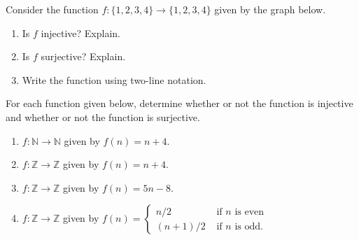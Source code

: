 \documentclass[10pt,]{book}
\theoremstyle{plain}
\theoremstyle{definition}
\theoremstyle{definition}
\theoremstyle{definition}
\theoremstyle{definition}
\numberwithin{equation}{chapter}
\def\N{\mathbb N}
\def\Z{\mathbb Z}
\newcommand{\amp}{&}
\begin{document}
\begin{divisionexercise}{4}\hypertarget{exercise-206}{}
\hypertarget{p-1691}{}%
Consider the function \(f:\{1,2,3,4\} \to \{1,2,3,4\}\) given by the graph below.%
\begin{sidebyside}{1}{0.3}{0.3}{0}
\begin{sbspanel}{0.4}
\end{sbspanel}
\end{sidebyside}
\par
\hypertarget{p-1692}{}%
\leavevmode%
\begin{enumerate}[label=(\alph*)]
\item\hypertarget{li-567}{}\hypertarget{p-1693}{}%
Is \(f\) injective? Explain.%
\item\hypertarget{li-568}{}\hypertarget{p-1694}{}%
Is \(f\) surjective? Explain.%
\item\hypertarget{li-569}{}\hypertarget{p-1695}{}%
Write the function using two-line notation.%
\end{enumerate}
%
\end{divisionexercise}%
\begin{divisionexercise}{5}\hypertarget{exercise-207}{}
\hypertarget{p-1700}{}%
For each function given below, determine whether or not the function is injective and whether or not the function is surjective. \leavevmode%
\begin{enumerate}[label=(\alph*)]
\item\hypertarget{li-573}{}\(f:\N \to \N\) given by \(f(n) = n+4\).%
\item\hypertarget{li-574}{}\(f:\Z \to \Z\) given by \(f(n) = n+4\).%
\item\hypertarget{li-575}{}\(f:\Z \to \Z\) given by \(f(n) = 5n - 8\).%
\item\hypertarget{li-576}{}\(f:\Z \to \Z\) given by \(f(n) = \begin{cases}n/2 \amp  \text{ if } n \text{ is even} \\ (n+1)/2 \amp \text{ if } n \text{ is odd} . \end{cases}\)%
\end{enumerate}
%
\end{divisionexercise}%
\end{document}
